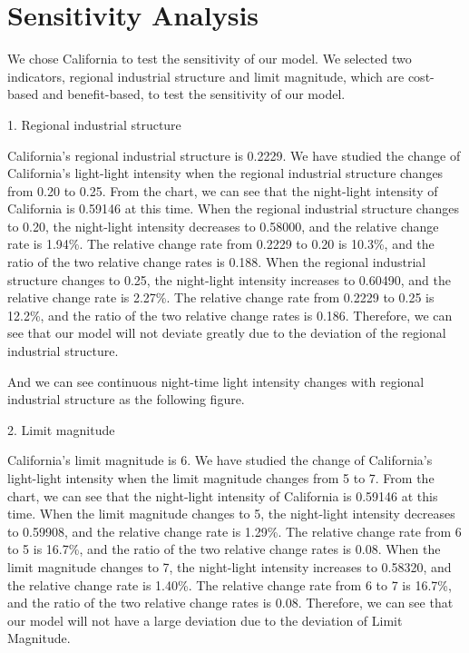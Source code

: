 \MinParskip{}

\section{Sensitivity Analysis}

We chose California to test the sensitivity of our model. We selected two indicators, regional industrial structure and limit magnitude, which are cost-based and benefit-based, to test the sensitivity of our model.

1. Regional industrial structure

California's regional industrial structure is 0.2229. We have studied the change of California's light-light intensity when the regional industrial structure changes from 0.20 to 0.25. From the chart, we can see that the night-light intensity of California is 0.59146 at this time. When the regional industrial structure changes to 0.20, the night-light intensity decreases to 0.58000, and the relative change rate is 1.94\%. The relative change rate from 0.2229 to 0.20 is 10.3\%, and the ratio of the two relative change rates is 0.188. When the regional industrial structure changes to 0.25, the night-light intensity increases to 0.60490, and the relative change rate is 2.27\%. The relative change rate from 0.2229 to 0.25 is 12.2\%, and the ratio of the two relative change rates is 0.186. Therefore, we can see that our model will not deviate greatly due to the deviation of the regional industrial structure.

And we can see continuous night-time light intensity changes with regional industrial structure as the following figure.

2. Limit magnitude

California's limit magnitude is 6. We have studied the change of California's light-light intensity when the limit magnitude changes from 5 to 7. From the chart, we can see that the night-light intensity of California is 0.59146 at this time. When the limit magnitude changes to 5, the night-light intensity decreases to 0.59908, and the relative change rate is 1.29\%. The relative change rate from 6 to 5 is 16.7\%, and the ratio of the two relative change rates is 0.08. When the limit magnitude changes to 7, the night-light intensity increases to 0.58320, and the relative change rate is 1.40\%. The relative change rate from 6 to 7 is 16.7\%, and the ratio of the two relative change rates is 0.08. Therefore, we can see that our model will not have a large deviation due to the deviation of Limit Magnitude.

